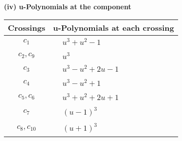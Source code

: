 \documentclass[1p]{elsarticle_modified}
\theoremstyle{definition}
\begin{document}
\newpage\renewcommand{\arraystretch}{1}
\flushleft \textbf{(iv) u-Polynomials at the component}\newline \\
\begin{tabular}{m{50pt}|m{274pt}}
Crossings & \hspace{64pt}u-Polynomials at each crossing \\
\hline $$\begin{aligned}c_{1}\end{aligned}$$&$\begin{aligned}
&u^3+u^2-1
\end{aligned}$\\
\hline $$\begin{aligned}c_{2},c_{9}\end{aligned}$$&$\begin{aligned}
&u^3
\end{aligned}$\\
\hline $$\begin{aligned}c_{3}\end{aligned}$$&$\begin{aligned}
&u^3- u^2+2 u-1
\end{aligned}$\\
\hline $$\begin{aligned}c_{4}\end{aligned}$$&$\begin{aligned}
&u^3- u^2+1
\end{aligned}$\\
\hline $$\begin{aligned}c_{5},c_{6}\end{aligned}$$&$\begin{aligned}
&u^3+u^2+2 u+1
\end{aligned}$\\
\hline $$\begin{aligned}c_{7}\end{aligned}$$&$\begin{aligned}
&(u-1)^3
\end{aligned}$\\
\hline $$\begin{aligned}c_{8},c_{10}\end{aligned}$$&$\begin{aligned}
&(u+1)^3
\end{aligned}$\\
\hline
\end{tabular}\\~\\
\newpage\renewcommand{\arraystretch}{1}
\end{document}
